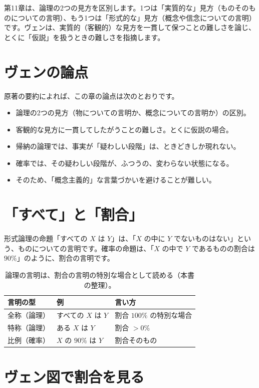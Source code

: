 \documentclass[a4paper,11pt,openany]{ltjsbook}
\begin{document}
第11章は、論理の2つの見方を区別します。1つは「実質的な」見方（ものそのものについての言明）、もう1つは「形式的な」見方（概念や信念についての言明）です。ヴェンは、実質的（客観的）な見方を一貫して保つことの難しさを論じ、とくに「仮説」を扱うときの難しさを指摘します。

\section{ヴェンの論点}

原著の要約によれば、この章の論点は次のとおりです。

\begin{itemize}[leftmargin=*]
\item 論理の2つの見方（物についての言明か、概念についての言明か）の区別。
\item 客観的な見方に一貫してしたがうことの難しさ。とくに仮説の場合。
\item 帰納の論理では、事実が「疑わしい段階」は、ときどきしか現れない。
\item 確率では、その疑わしい段階が、ふつうの、変わらない状態になる。
\item そのため、「概念主義的」な言葉づかいを避けることが難しい。
\end{itemize}

\section{「すべて」と「割合」}

形式論理の命題「すべての $X$ は $Y$」は、「$X$ の中に $Y$ でないものはない」という、ものについての言明です。確率の命題は、「$X$ の中で $Y$ であるものの割合は $90\%$」のように、割合の言明です。

\begin{table}[htbp]
\centering
\begin{tabular}{lll}
\toprule
言明の型 & 例 & 言い方\\
\midrule
全称（論理） & すべての $X$ は $Y$ & 割合 $100\%$ の特別な場合\\
特称（論理） & ある $X$ は $Y$ & 割合 $>0\%$\\
比例（確率） & $X$ の $90\%$ は $Y$ & 割合そのもの\\
\bottomrule
\end{tabular}
\caption{論理の言明は、割合の言明の特別な場合として読める（本書の整理）。}
\end{table}

\section{ヴェン図で割合を見る}
\end{document}
